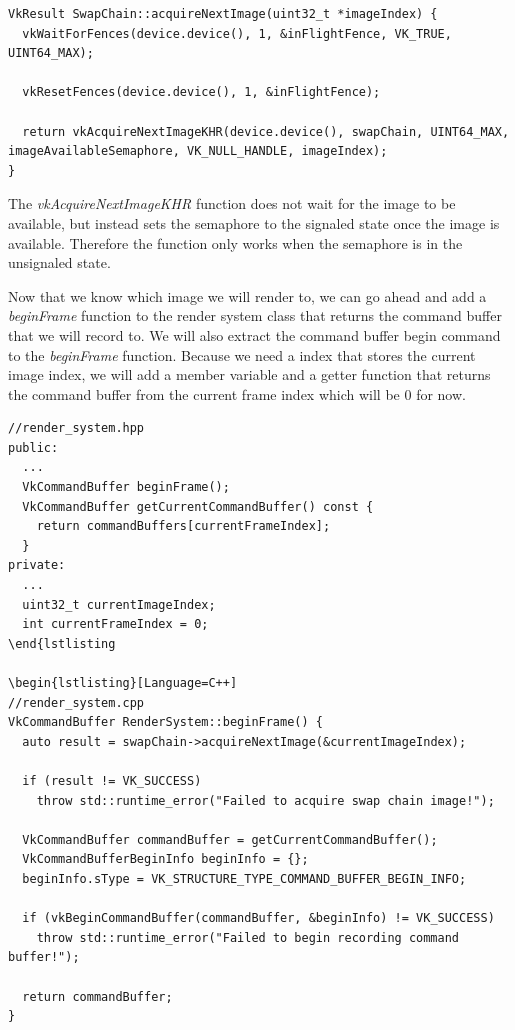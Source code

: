 \documentclass[12pt]{report} \usepackage{preamble}
\begin{document}
\begin{lstlisting}[Language=C++]
VkResult SwapChain::acquireNextImage(uint32_t *imageIndex) {
  vkWaitForFences(device.device(), 1, &inFlightFence, VK_TRUE, UINT64_MAX);

  vkResetFences(device.device(), 1, &inFlightFence);

  return vkAcquireNextImageKHR(device.device(), swapChain, UINT64_MAX, imageAvailableSemaphore, VK_NULL_HANDLE, imageIndex);
}
\end{lstlisting}

The \textit{vkAcquireNextImageKHR} function does not wait for the image to be available, but instead sets the semaphore to the signaled state
once the image is available. Therefore the function only works when the semaphore is in the unsignaled state.

Now that we know which image we will render to, we can go ahead and add a \textit{beginFrame} function to the render system class that
returns the command buffer that we will record to. We will also extract the command buffer begin command to the \textit{beginFrame}
function. Because we need a index that stores the current image index, we will add a member variable
and a getter function that returns the command buffer from the current frame index which will be 0 for now.

\begin{lstlisting}[Language=C++]
//render_system.hpp
public:
  ...
  VkCommandBuffer beginFrame();
  VkCommandBuffer getCurrentCommandBuffer() const { 
    return commandBuffers[currentFrameIndex]; 
  }
private:
  ...
  uint32_t currentImageIndex;
  int currentFrameIndex = 0;
\end{lstlisting

\begin{lstlisting}[Language=C++]
//render_system.cpp
VkCommandBuffer RenderSystem::beginFrame() {
  auto result = swapChain->acquireNextImage(&currentImageIndex);

  if (result != VK_SUCCESS)
    throw std::runtime_error("Failed to acquire swap chain image!");

  VkCommandBuffer commandBuffer = getCurrentCommandBuffer();
  VkCommandBufferBeginInfo beginInfo = {};
  beginInfo.sType = VK_STRUCTURE_TYPE_COMMAND_BUFFER_BEGIN_INFO;

  if (vkBeginCommandBuffer(commandBuffer, &beginInfo) != VK_SUCCESS)
    throw std::runtime_error("Failed to begin recording command buffer!");

  return commandBuffer;
}
\end{lstlisting}
\end{document}
